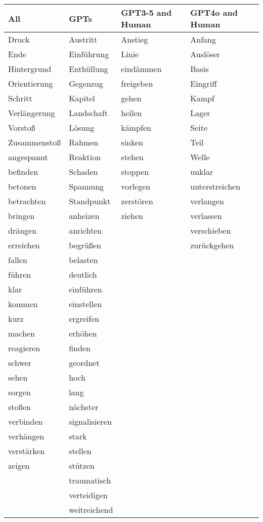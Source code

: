 \begin{tabular}{llll}
\toprule
All & GPTs & GPT3-5 and Human & GPT4o and Human \\
\midrule
Druck & Austritt & Anstieg & Anfang \\
Ende & Einführung & Linie & Auslöser \\
Hintergrund & Enthüllung & eindämmen & Basis \\
Orientierung & Gegenzug & freigeben & Eingriff \\
Schritt & Kapitel & gehen & Kampf \\
Verlängerung & Landschaft & heilen & Lager \\
Vorstoß & Lösung & kämpfen & Seite \\
Zusammenstoß & Rahmen & sinken & Teil \\
angespannt & Reaktion & stehen & Welle \\
befinden & Schaden & stoppen & unklar \\
betonen & Spannung & vorlegen & unterstreichen \\
betrachten & Standpunkt & zerstören & verlangen \\
bringen & anheizen & ziehen & verlassen \\
drängen & anrichten &  & verschieben \\
erreichen & begrüßen &  & zurückgehen \\
fallen & belasten &  &  \\
führen & deutlich &  &  \\
klar & einführen &  &  \\
kommen & einstellen &  &  \\
kurz & ergreifen &  &  \\
machen & erhöhen &  &  \\
reagieren & finden &  &  \\
schwer & geordnet &  &  \\
sehen & hoch &  &  \\
sorgen & lang &  &  \\
stoßen & nächster &  &  \\
verbinden & signalisieren &  &  \\
verhängen & stark &  &  \\
verstärken & stellen &  &  \\
zeigen & stützen &  &  \\
 & traumatisch &  &  \\
 & verteidigen &  &  \\
 & weitreichend &  &  \\
\bottomrule
\end{tabular}
